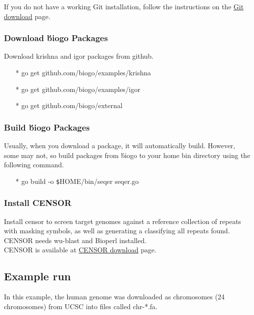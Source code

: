 \documentclass[12pt]{report}
\begin{document}
\noindent If you do not have a working Git installation, follow the instructions on the \href{https://git-scm.com/downloads}{\color{blue}Git download} page.

\subsubsection*{ Download \'biogo Packages}
Download krishna and igor packages from github.

\begin{enumerate}
	\item[*] go get github.com/biogo/examples/krishna
	\item[*] go get github.com/biogo/examples/igor
	\item[*] go get github.com/biogo/external
\end{enumerate}

\subsubsection*{ Build \'biogo Packages}
Usually, when you download a package, it will automatically build. However, some may not, so build packages from \'biogo to your home bin directory using the following command.

\begin{enumerate}
	\item[*] go build -o \texttt{\$}HOME/bin/seqer seqer.go
\end{enumerate}

\subsubsection*{ Install CENSOR}
Install censor to screen target genomes against a reference collection of repeats with masking symbols, as well as generating a 
classifying all repeats found. CENSOR needs wu-blast and Bioperl installed.\\

\noindent CENSOR is available at \href{http://www.girinst.org/downloads/software/censor/} {\color{blue}CENSOR download} page.



\subsection*{Example run}
In this example, the human genome was downloaded as chromosomes (24 chromosomes) from UCSC into files called chr-*.fa.\\
\end{document}
